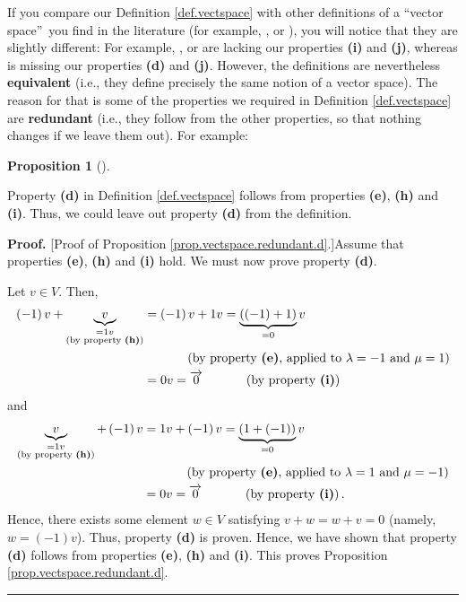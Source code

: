 \documentclass[numbers=enddot,12pt,final,onecolumn,notitlepage]{scrartcl}%
\theoremstyle{definition}
\newtheorem{prop}[theo]{Proposition}
\newenvironment{proposition}[1][]
{\begin{prop}[#1]\begin{leftbar}}
{\end{leftbar}\end{prop}}
\newenvironment{proof}[1][Proof]{\noindent\textbf{#1.} }{\ \rule{0.5em}{0.5em}}
\begin{document}
If you compare our Definition \ref{def.vectspace} with other definitions of a
\textquotedblleft vector space\textquotedblright\ you find in the literature
(for example, \cite[Definition 4.1.1]{LaNaSc16}, \cite[Definition
2.1]{OlvSha06} or \cite[Definition Two.I.1]{Heffer16}), you will notice that
they are slightly different: For example, \cite[Definition 4.1.1]{LaNaSc16},
\cite[Definition 2.1]{OlvSha06} or \cite[Definition Two.I.1]{Heffer16} are
lacking our properties \textbf{(i)} and \textbf{(j)}, whereas \cite[Definition
2.3.1]{Kowals16} is missing our properties \textbf{(d)} and \textbf{(j)}.
However, the definitions are nevertheless \textbf{equivalent} (i.e., they
define precisely the same notion of a vector space). The reason for that is
some of the properties we required in Definition \ref{def.vectspace} are
\textbf{redundant} (i.e., they follow from the other properties, so that
nothing changes if we leave them out). For example:

\begin{proposition}
\label{prop.vectspace.redundant.d}Property \textbf{(d)} in Definition
\ref{def.vectspace} follows from properties \textbf{(e)}, \textbf{(h)} and
\textbf{(i)}. Thus, we could leave out property \textbf{(d)} from the definition.
\end{proposition}

\begin{proof}
[Proof of Proposition \ref{prop.vectspace.redundant.d}.]Assume that properties
\textbf{(e)}, \textbf{(h)} and \textbf{(i)} hold. We must now prove property
\textbf{(d)}.

Let $v\in V$. Then,
\begin{align*}
\left(  -1\right)  v+\underbrace{v}_{\substack{=1v\\\text{(by property
\textbf{(h)})}}}  &  =\left(  -1\right)  v+1v=\underbrace{\left(  \left(
-1\right)  +1\right)  }_{=0}v\\
&  \ \ \ \ \ \ \ \ \ \ \left(  \text{by property \textbf{(e)}, applied to
}\lambda=-1\text{ and }\mu=1\right) \\
&  =0v=\overrightarrow{0}\ \ \ \ \ \ \ \ \ \ \left(  \text{by property
\textbf{(i)}}\right)
\end{align*}
and%
\begin{align*}
\underbrace{v}_{\substack{=1v\\\text{(by property \textbf{(h)})}}}+\left(
-1\right)  v  &  =1v+\left(  -1\right)  v=\underbrace{\left(  1+\left(
-1\right)  \right)  }_{=0}v\\
&  \ \ \ \ \ \ \ \ \ \ \left(  \text{by property \textbf{(e)}, applied to
}\lambda=1\text{ and }\mu=-1\right) \\
&  =0v=\overrightarrow{0}\ \ \ \ \ \ \ \ \ \ \left(  \text{by property
\textbf{(i)}}\right)  .
\end{align*}
Hence, there exists some element $w\in V$ satisfying $v+w=w+v=0$ (namely,
$w=\left(  -1\right)  v$). Thus, property \textbf{(d)} is proven. Hence, we
have shown that property \textbf{(d)} follows from properties \textbf{(e)},
\textbf{(h)} and \textbf{(i)}. This proves Proposition
\ref{prop.vectspace.redundant.d}.
\end{proof}
\end{document}
